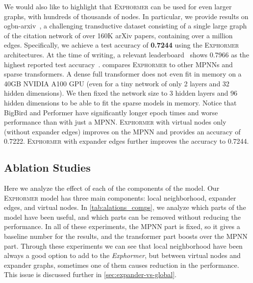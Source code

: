 \documentclass{article}
\theoremstyle{plain}
\theoremstyle{definition}
\theoremstyle{remark}
\begin{document}
We would also like to highlight that \textsc{Exphormer} can be used for even larger graphs, with hundreds of thousands of nodes. In particular, we provide results on ogbn-arxiv~\citep{HuFZDRLCL20}, a challenging transductive dataset consisting of a single large graph of the citation network of over 160K arXiv papers, containing over a million edges.
Specifically, we achieve a test accuracy of {\bf 0.7244} using the \textsc{Exphormer} architectures. At the time of writing, a relevant leaderboard~\citep{ogbleaderboard} shows 0.7966 as the highest reported test accuracy~\citep{zhao:variational}.  compares \textsc{Exphormer} to other MPNNs and sparse transformers. 
A dense full transformer does not even fit in memory on a 40GB NVIDIA A100 GPU (even for a tiny network of only 2 layers and 32 hidden dimensions). We then fixed the network size to 3 hidden layers and 96 hidden dimensions to be able to fit the sparse models in memory. Notice that BigBird and Performer have significantly longer epoch times and worse performance than with just a MPNN. \textsc{Exphormer} with virtual nodes only (without expander edges) improves on the MPNN and provides an accuracy of 0.7222. \textsc{Exphormer} with expander edges further improves the accuracy to 0.7244.















\subsection{Ablation Studies}
\label{sec:ablation}
Here we analyze the effect of each of the components of the model. Our \textsc{Exphormer} model has three main components: local neighborhood, expander edges, and virtual nodes. In \cref{tab:alations_comps}, we analyze which parts of the model have been useful, and which parts can be removed without reducing the performance. In all of these experiments, the MPNN part is fixed, so it gives a baseline number for the results, and the transformer part boosts over the MPNN part.
Through these experiments we can see that local neighborhood have been always a good option to add to the \emph{Exphormer}, but between virtual nodes and expander graphs, sometimes one of them causes reduction in the performance.
This issue is discussed further in \cref{sec:expander-vs-global}.
\end{document}
